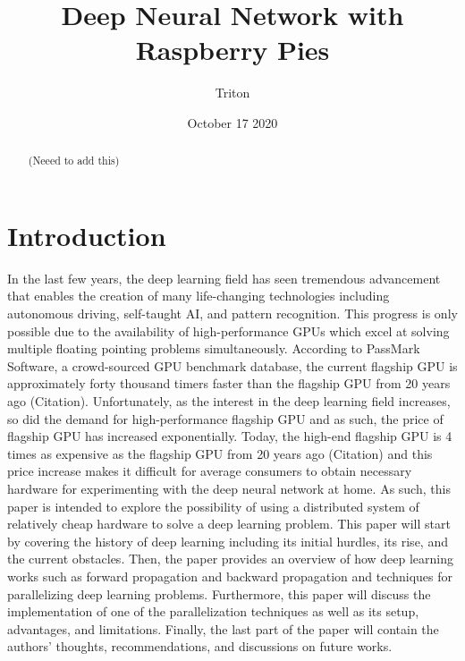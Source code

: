 \documentclass{IEEEtran}
\begin{document}
    \title{Deep Neural Network with Raspberry Pies}
    \author{Triton}
    \date{October 17 2020}
    \maketitle

    \begin{abstract}
        (Neeed to add this)
    \end{abstract}

    \section{Introduction}
        In the last few years, the deep learning field has seen tremendous advancement that enables the creation of many life-changing technologies including autonomous driving, self-taught AI, and pattern recognition. This progress is only possible due to the availability of high-performance GPUs which excel at solving multiple floating pointing problems simultaneously. According to PassMark Software, a crowd-sourced GPU benchmark database, the current flagship GPU is approximately forty thousand timers faster than the flagship GPU from 20 years ago (Citation). Unfortunately, as the interest in the deep learning field increases, so did the demand for high-performance flagship GPU and as such, the price of flagship GPU has increased exponentially. Today, the high-end flagship GPU is 4 times as expensive as the flagship GPU from 20 years ago (Citation) and this price increase makes it difficult for average consumers to obtain necessary hardware for experimenting with the deep neural network at home. As such, this paper is intended to explore the possibility of using a distributed system of relatively cheap hardware to solve a deep learning problem. This paper will start by covering the history of deep learning including its initial hurdles, its rise, and the current obstacles. Then, the paper provides an overview of how deep learning works such as forward propagation and backward propagation and techniques for parallelizing deep learning problems. Furthermore, this paper will discuss the implementation of one of the parallelization techniques as well as its setup, advantages, and limitations. Finally, the last part of the paper will contain the authors’ thoughts, recommendations, and discussions on future works.
    
\end{document}
